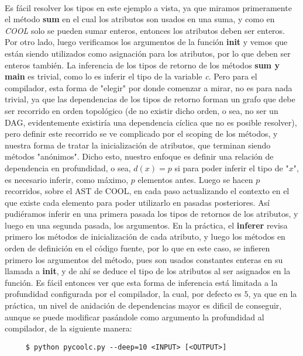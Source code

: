 \documentclass[a4paper, 12pt]{article}
\begin{document}
\begin{itemize}
\begin{itemize}
\paragraph{}
Es f\'acil resolver los tipos en este ejemplo a vista, ya que miramos primeramente el m\'etodo \textbf{sum}
en el cual los atributos son usados en una suma, y como en \textit{COOL} solo se pueden sumar enteros,
entonces los atributos deben ser enteros. Por otro lado, luego verificamos los argumentos de la funci\'on \textbf{init}
y vemos que est\'an siendo utilizados como asignaci\'on para los atributos, por lo que deben ser enteros tambi\'en.
La inferencia de los tipos de retorno de los m\'etodos \textbf{sum y main} es trivial, como lo es inferir el tipo de
la variable \textit{c}. Pero para el compilador, esta forma de "elegir" por donde comenzar a mirar, no es para nada trivial, ya que
las dependencias de los tipos de retorno forman un grafo que debe ser recorrido en orden topol\'ogico (de no existir dicho orden, o sea, no ser un DAG, 
evidentemente existir\'ia una dependencia c\'iclica que no es posible resolver), pero definir este recorrido se ve complicado
por el scoping de los m\'etodos, y nuestra forma de tratar la inicializaci\'on de atributos, que terminan siendo m\'etodos "an\'onimos".
Dicho esto, nuestro enfoque es definir una relaci\'on de dependencia en profundidad, o sea, $d(x) = p$ si para
poder inferir el tipo de "$x$", es necesario inferir, como m\'aximo, $p$ elementos antes. Luego se hacen $p$ recorridos, sobre el AST
de COOL, en cada paso actualizando el contexto en el que existe cada elemento para poder utilizarlo en pasadas posteriores. As\'i
pudi\'eramos inferir en una primera pasada los tipos de retornos de los atributos, y luego en una segunda pasada, los argumentos.
En la pr\'actica, el \textbf{inferer} revisa primero los m\'etodos de inicializaci\'on de cada atributo, y luego
los m\'etodos en orden de definici\'on en el c\'odigo fuente, por lo que en este caso, se infieren primero los argumentos del m\'etodo,
pues son usados constantes enteras en su llamada a \textbf{init}, y de ah\'i se deduce el tipo de los atributos al ser asignados en la función.
Es f\'acil entonces ver que esta forma de inferencia est\'a limitada a la profundidad configurada por el compilador, la cual, por defecto
 es $5$, ya que en la pr\'actica, un nivel de anidaci\'on de dependencias mayor es dificil de conseguir, aunque se puede modificar
 pas\'andole como argumento la profundidad al compilador, de la siguiente manera:

 \begin{verbatim}
	 $ python pycoolc.py --deep=10 <INPUT> [<OUTPUT>]
 \end{verbatim}


\end{itemize}
\end{itemize}
\end{document}
